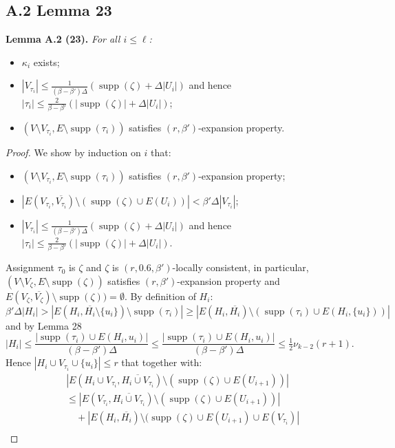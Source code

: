 \documentclass[10pt,a4paper]{article}
\newcommand{\supp}{\operatorname{supp}}
\newenvironment{result}[1]{\par\medskip\noindent\textbf{#1.}\itshape}{\par\medskip}
\begin{document}
\subsection*{A.2 Lemma 23}
\begin{result}{Lemma A.2 (23)}
For all $i\le\ell$:
\begin{itemize}\item $\kappa_i$ exists;
\item $|V_{\tau_i}|\le\frac{1}{(\beta-\beta')\Delta}(\supp(\zeta)+\Delta|U_i|)$ and hence $|\tau_i|\le\frac{2}{\beta-\beta'}(|\supp(\zeta)|+\Delta|U_i|)$;
\item $(V\setminus V_{\tau_i},E\setminus\supp(\tau_i))$ satisfies $(r,\beta')$-expansion property.\end{itemize}
\end{result}
\begin{proof}
We show by induction on $i$ that:
\begin{itemize}\item $(V\setminus V_{\tau_i},E\setminus\supp(\tau_i))$ satisfies $(r,\beta')$-expansion property;
\item $|E(V_{\tau_i},\overline{V_{\tau_i}})\setminus(\supp(\zeta)\cup E(U_i))|<\beta'\Delta|V_{\tau_i}|$;
\item $|V_{\tau_i}|\le\frac{1}{(\beta-\beta')\Delta}(\supp(\zeta)+\Delta|U_i|)$ and hence $|\tau_i|\le\frac{2}{\beta-\beta'}(|\supp(\zeta)|+\Delta|U_i|)$.\end{itemize}
Assignment $\tau_0$ is $\zeta$ and $\zeta$ is $(r,0.6,\beta')$-locally consistent, in particular, $(V\setminus V_\zeta,E\setminus\supp(\zeta))$ satisfies $(r,\beta')$-expansion property and $E(V_\zeta,\overline{V_\zeta})\setminus\supp(\zeta))=\emptyset$.
By definition of $H_i$:
\[\beta'\Delta|H_i|>|E(H_i,\overline{H_i}\setminus\{u_i\})\setminus\supp(\tau_i)|\ge|E(H_i,\overline{H_i})\setminus(\supp(\tau_i)\cup E(H_i,\{u_i\}))|\]
and by Lemma 28
\[|H_i|\le\frac{|\supp(\tau_i)\cup E(H_i,u_i)|}{(\beta-\beta')\Delta}\le\frac{|\supp(\tau_i)\cup E(H_i,u_i)|}{(\beta-\beta')\Delta}\le\tfrac12\nu_{k-2}(r+1).\]
Hence $|H_i\cup V_{\tau_i}\cup\{u_i\}|\le r$ that together with:
\begin{align*}
&|E(H_i\cup V_{\tau_i},\overline{H_i\cup V_{\tau_i}})\setminus(\supp(\zeta)\cup E(U_{i+1}))|\\
&\le |E(V_{\tau_i},\overline{H_i\cup V_{\tau_i}})\setminus(\supp(\zeta)\cup E(U_{i+1}))|\\
&\quad+|E(H_i,\overline{H_i})\setminus(\supp(\zeta)\cup E(U_{i+1})\cup E(V_{\tau_i})|\\

\end{align*}
\end{proof}
\end{document}
